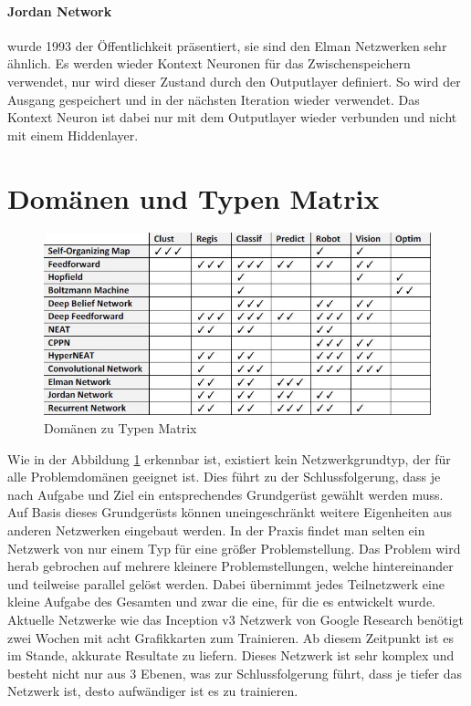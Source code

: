 \paragraph{Jordan Network} wurde 1993 der Öffentlichkeit präsentiert, sie sind den Elman Netzwerken sehr ähnlich. 
Es werden wieder Kontext Neuronen für das Zwischenspeichern verwendet, nur wird dieser Zustand durch den Outputlayer definiert.
So wird der Ausgang gespeichert und in der nächsten Iteration wieder verwendet.
Das Kontext Neuron ist dabei nur mit dem Outputlayer wieder verbunden und nicht mit einem Hiddenlayer.

\section{Domänen und Typen Matrix}

\begin{figure}
	\includegraphics[scale=0.68]{images/typen_domains.png}
	\caption{Domänen zu Typen Matrix \cite{AI3}}
	\label{fig:DomainMatrix}
\end{figure}

Wie in der Abbildung \ref{fig:DomainMatrix} erkennbar ist, existiert kein Netzwerkgrundtyp, der für alle Problemdomänen geeignet ist.
Dies führt zu der Schlussfolgerung, dass je nach Aufgabe und Ziel ein entsprechendes Grundgerüst gewählt werden muss. 
Auf Basis dieses Grundgerüsts können uneingeschränkt weitere Eigenheiten aus anderen Netzwerken eingebaut werden.
In der Praxis findet man selten ein Netzwerk von nur einem Typ für eine größer Problemstellung. 
Das Problem wird herab gebrochen auf mehrere kleinere Problemstellungen, welche hintereinander und teilweise parallel gelöst werden.
Dabei übernimmt jedes Teilnetzwerk eine kleine Aufgabe des Gesamten und zwar die eine, für die es entwickelt wurde. 
Aktuelle Netzwerke wie das Inception v3 Netzwerk von Google Research benötigt zwei Wochen mit acht Grafikkarten zum Trainieren. 
Ab diesem Zeitpunkt ist es im Stande, akkurate Resultate zu liefern. 
Dieses Netzwerk ist sehr komplex und besteht nicht nur aus 3 Ebenen, was zur Schlussfolgerung führt, dass je tiefer das Netzwerk ist, desto aufwändiger ist es zu trainieren.

